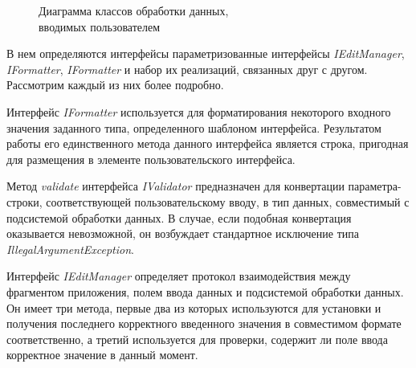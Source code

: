 \begin{figure}[h!]
  \centering
  \caption{Диаграмма классов обработки данных, \\ вводимых пользователем}
  \label{fig:implementation_ui_edit_manager}
\end{figure}

В нем определяются интерфейсы параметризованные интерфейсы
\textit{IEditManager}, \textit{IFormatter}, \textit{IFormatter}
и набор их реализаций, связанных друг с другом. Рассмотрим каждый из них более подробно.

Интерфейс \textit{IFormatter} используется для форматирования некоторого входного
значения заданного типа, определенного шаблоном интерфейса.
Результатом работы его единственного метода данного интерфейса является строка,
пригодная для размещения в элементе пользовательского интерфейса.

Метод \textit{validate} интерфейса \textit{IValidator} предназначен для
конвертации параметра-строки, соответствующей пользовательскому вводу,
в тип данных, совместимый с подсистемой обработки данных. В случае,
если подобная конвертация оказывается невозможной, он возбуждает
стандартное исключение типа \textit{IllegalArgumentException}.

Интерфейс \textit{IEditManager} определяет протокол взаимодействия
между фрагментом приложения, полем ввода данных
и подсистемой обработки данных.
Он имеет три метода, первые два из которых используются
для установки и получения последнего корректного введенного значения
в совместимом формате соответственно, а третий используется для проверки,
содержит ли поле ввода корректное значение в данный момент.

